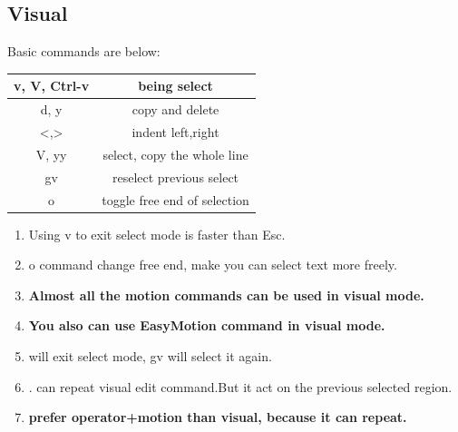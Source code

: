\documentclass[paper=8.5in:11in, twoside, 12pt, pagesize=pdftex]{book}
\begin{document}
\subsection{Visual}
		Basic commands are below:
		\begin{center}
			\begin{tabular}{c|c}
				\hline
				v, V, Ctrl-v  & being select\\
				
				\hline 
				d, y & copy and delete\\
				
				\hline
				<,> & indent left,right\\
				
				\hline
				V, yy & select, copy the whole line  \\
				
				\hline
				gv & reselect previous select \\
				
				\hline 
				o & toggle free end of selection \\
				
				\hline 		
			\end{tabular}
		\end{center}
		
		\begin{enumerate}
			\item Using v to exit select mode is faster than Esc. 
			
			\item o command change free end, make you can select text more freely.
			
			\item \textbf{Almost all the motion commands can be used in visual mode.}
			
			\item \textbf{You also can use EasyMotion command in visual mode.}
			
			\item <,> will exit select mode, gv will select it again. 
			
			\item . can repeat visual edit command.But it act on the previous selected region.  
			
			\item \textbf{prefer operator+motion than visual, because it can repeat.}
		\end{enumerate}					
		
\end{document}
